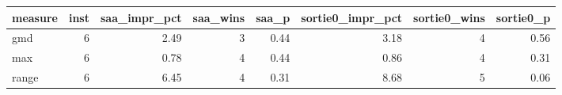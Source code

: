 \begin{tabular}{lrrrrrrr}
\toprule
measure & inst & saa_impr_pct & saa_wins & saa_p & sortie0_impr_pct & sortie0_wins & sortie0_p \\
\midrule
gmd & 6 & 2.49 & 3 & 0.44 & 3.18 & 4 & 0.56 \\
max & 6 & 0.78 & 4 & 0.44 & 0.86 & 4 & 0.31 \\
range & 6 & 6.45 & 4 & 0.31 & 8.68 & 5 & 0.06 \\
\bottomrule
\end{tabular}
